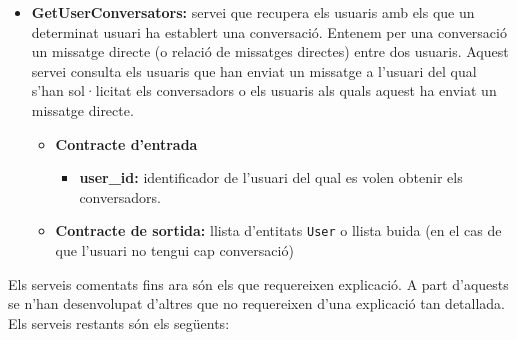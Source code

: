 \begin{itemize}
			\item \textbf{GetUserConversators:} servei que recupera els usuaris amb els que un determinat usuari ha establert una conversació. Entenem per una conversació un missatge directe (o relació de missatges directes) entre dos usuaris. Aquest servei consulta els usuaris que han enviat un missatge a l'usuari del qual s'han sol·licitat els conversadors o els usuaris als quals aquest ha enviat un missatge directe.
			
				\begin{itemize}
					\item \textbf{Contracte d'entrada}
						\begin{itemize}
							\item \textbf{user\_id:} identificador de l'usuari del qual es volen obtenir els conversadors.
						\end{itemize}
					\item \textbf{Contracte de sortida:} llista d'entitats \texttt{User} o llista buida (en el cas de que l'usuari no tengui cap conversació)
				\end{itemize}
			
		\end{itemize}
		
		Els serveis comentats fins ara són els que requereixen explicació. A part d'aquests se n'han desenvolupat d'altres que no requereixen d'una explicació tan detallada. Els serveis restants són els següents:
		
